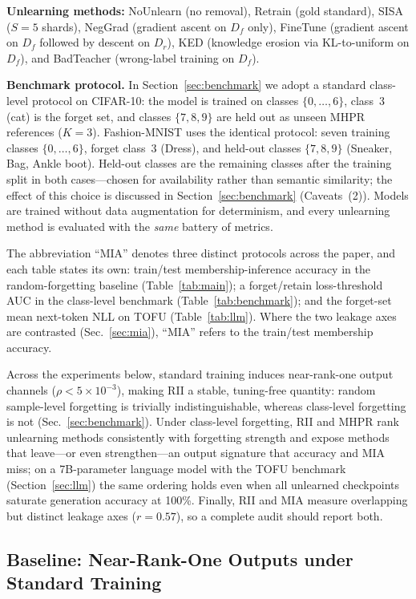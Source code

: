 \documentclass[smallextended]{svjour3}       %
\begin{document}
\textbf{Unlearning methods:} NoUnlearn (no removal), Retrain (gold standard), SISA~\cite{bourtoule2021machine} ($S{=}5$ shards), NegGrad (gradient ascent on $D_f$ only), FineTune (gradient ascent on $D_f$ followed by descent on $D_r$), KED (knowledge erosion via KL-to-uniform on $D_f$), and BadTeacher (wrong-label training on $D_f$).

\textbf{Benchmark protocol.} In Section~\ref{sec:benchmark} we adopt a standard class-level protocol on CIFAR-10: the model is trained on classes $\{0,\dots,6\}$, class~3 (cat) is the forget set, and classes $\{7,8,9\}$ are held out as unseen MHPR references ($K{=}3$). Fashion-MNIST uses the identical protocol: seven training classes $\{0,\dots,6\}$, forget class~3 (Dress), and held-out classes $\{7,8,9\}$ (Sneaker, Bag, Ankle boot). Held-out classes are the remaining classes after the training split in both cases---chosen for availability rather than semantic similarity; the effect of this choice is discussed in Section~\ref{sec:benchmark} (Caveats~(2)). Models are trained without data augmentation for determinism, and every unlearning method is evaluated with the \emph{same} battery of metrics.

The abbreviation ``MIA'' denotes three distinct protocols across the paper, and each table states its own: train/test membership-inference accuracy in the random-forgetting baseline (Table~\ref{tab:main}); a forget/retain loss-threshold AUC in the class-level benchmark (Table~\ref{tab:benchmark}); and the forget-set mean next-token NLL on TOFU (Table~\ref{tab:llm}). Where the two leakage axes are contrasted (Sec.~\ref{sec:mia}), ``MIA'' refers to the train/test membership accuracy.

Across the experiments below, standard training induces near-rank-one output channels ($\rho<5\times10^{-3}$), making RII a stable, tuning-free quantity: random sample-level forgetting is trivially indistinguishable, whereas class-level forgetting is not (Sec.~\ref{sec:benchmark}). Under class-level forgetting, RII and MHPR rank unlearning methods consistently with forgetting strength and expose methods that leave---or even strengthen---an output signature that accuracy and MIA miss; on a 7B-parameter language model with the TOFU benchmark (Section~\ref{sec:llm}) the same ordering holds even when all unlearned checkpoints saturate generation accuracy at 100\%. Finally, RII and MIA measure overlapping but distinct leakage axes ($r{=}0.57$), so a complete audit should report both.

\subsection{Baseline: Near-Rank-One Outputs under Standard Training}
\end{document}
